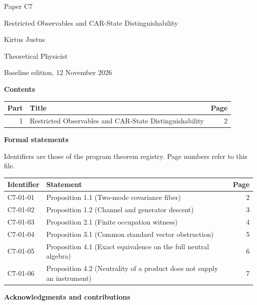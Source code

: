 \documentclass[11pt,a4paper]{article}
\begin{document}
\thispagestyle{empty}\pagestyle{empty}
{\small\sffamily \ProgramTitle\hfill Paper C7\par}
\vspace*{12mm}
{\LARGE\bfseries\raggedright{} Restricted Observables and CAR-State Distinguishability\par}
\vspace{9mm}
{\large Kirtus Justus\par}\vspace{1mm}Theoretical Physicist\par\AuthorLocation\par\vspace{2mm}Baseline edition, 12 November 2026\par\vspace{8mm}
\textbf{Contents}\par\vspace{1mm}
{\small\begin{longtable}{@{}r>{\raggedright\arraybackslash}p{}r@{}}
\toprule Part & Title & Page\\\midrule\endhead
1 & Restricted Observables and CAR-State Distinguishability & 2\\
\bottomrule\end{longtable}}
\vspace{2mm}\textbf{Formal statements}\par\vspace{1mm}
{\footnotesize Identifiers are those of the program theorem registry. Page numbers refer to this file.\par}
{\footnotesize\begin{longtable}{@{}l>{\raggedright\arraybackslash}p{}r@{}}
\toprule Identifier & Statement & Page\\\midrule\endhead
C7-01-01 & Proposition 1.1 (Two-mode covariance fiber) & 2\\
C7-01-02 & Proposition 1.2 (Channel and generator descent) & 3\\
C7-01-03 & Proposition 2.1 (Finite occupation witness) & 4\\
C7-01-04 & Proposition 3.1 (Common standard vector obstruction) & 5\\
C7-01-05 & Proposition 4.1 (Exact equivalence on the full neutral algebra) & 6\\
C7-01-06 & Proposition 4.2 (Neutrality of a product does not supply an instrument) & 7\\
\bottomrule\end{longtable}}
\vspace{3mm}\textbf{Acknowledgments and contributions}\par
\end{document}
